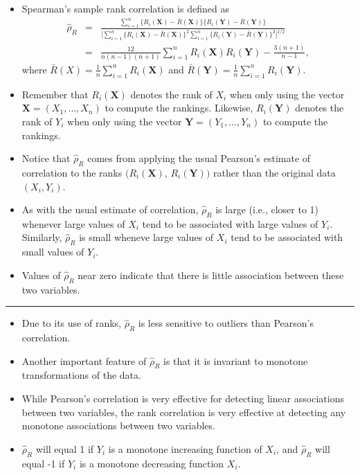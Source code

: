 \documentclass[]{book}
\begin{document}
\begin{itemize}
\item
  Spearman's sample rank correlation is defined as
  \begin{eqnarray}
  \hat{\rho}_{R} &=& \frac{\sum_{i=1}^{n} \{R_{i}(\mathbf{X}) - \bar{R}(\mathbf{X}) \}\{ R_{i}(\mathbf{Y}) - \bar{R}(\mathbf{Y}) \}}{ \big[ \sum_{i=1}^{n} \{R_{i}(\mathbf{X}) - \bar{R}(\mathbf{X}) \}^{2} \sum_{i=1}^{n}\{ R_{i}(\mathbf{Y}) - \bar{R}(\mathbf{Y}) \}^{2} \big]^{1/2} } \nonumber \\
  &=& \frac{12}{n(n-1)(n+1)}\sum_{i=1}^{n} R_{i}( \mathbf{X} )R_{i}(\mathbf{Y}) - \frac{3(n+1)}{n-1},
  \label{eq:spearman-simplifiation}
  \end{eqnarray}
  where \(\bar{R}(X) = \frac{1}{n}\sum_{i=1}^{n} R_{i}( \mathbf{X} )\) and \(\bar{R}( \mathbf{Y} ) = \frac{1}{n} \sum_{i=1}^{n} R_{i}( \mathbf{Y} )\).
\item
  Remember that \(R_{i}(\mathbf{X})\) denotes the rank of \(X_{i}\) when only using the vector \(\mathbf{X} = (X_{1}, \ldots, X_{n})\) to compute the rankings. Likewise, \(R_{i}(\mathbf{Y})\) denotes the rank of \(Y_{i}\) when only using the vector \(\mathbf{Y} = (Y_{1}, \ldots, Y_{n})\) to compute the rankings.
\item
  Notice that \(\hat{\rho}_{R}\) comes from applying the usual Pearson's estimate of correlation to the ranks \((R_{i}( \mathbf{X} )\), \(R_{i}(\mathbf{Y}) )\) rather than the original data \((X_{i}, Y_{i})\).
\item
  As with the usual estimate of correlation, \(\hat{\rho}_{R}\) is large (i.e., closer to 1) whenever large values of \(X_{i}\) tend to be associated with large values of \(Y_{i}\). Similarly, \(\hat{\rho}_{R}\) is small wheneve large values of \(X_{i}\) tend to be associated with small values of \(Y_{i}\).
\item
  Values of \(\hat{\rho}_{R}\) near zero indicate that there is little association
  between these two variables.
\end{itemize}

\begin{center}\rule{0.5\linewidth}{\linethickness}\end{center}

\begin{itemize}
\item
  Due to its use of ranks, \(\hat{\rho}_{R}\) is less sensitive to outliers than Pearson's correlation.
\item
  Another important feature of \(\hat{\rho}_{R}\) is that it is invariant to monotone transformations
  of the data.
\item
  While Pearson's correlation is very effective for detecting linear associations between two variables,
  the rank correlation is very effective at detecting any monotone associations between two variables.
\item
  \(\hat{\rho}_{R}\) will equal 1 if \(Y_{i}\) is a monotone increasing function of \(X_{i}\),
  and \(\hat{\rho}_{R}\) will equal -1 if \(Y_{i}\) is a monotone decreasing function \(X_{i}\).
\end{itemize}
\end{document}

